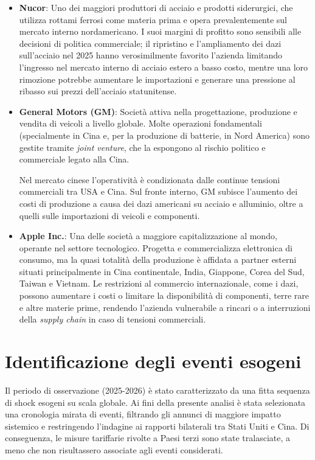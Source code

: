 \begin{itemize}
\item \textbf{Nucor}: Uno dei maggiori produttori di acciaio e prodotti siderurgici, che utilizza rottami ferrosi come materia prima e opera prevalentemente sul mercato interno nordamericano. 
I suoi margini di profitto sono sensibili alle decisioni di politica commerciale; il ripristino e l'ampliamento dei dazi sull'acciaio nel 2025 hanno verosimilmente favorito 
l'azienda limitando l'ingresso nel mercato interno di acciaio estero a basso costo, mentre una loro rimozione potrebbe aumentare le importazioni e generare una pressione al ribasso sui prezzi 
dell'acciaio statunitense\cite{sec:nucor}.

\item \textbf{General Motors (GM)}: Società attiva nella progettazione, produzione e vendita di veicoli a livello globale. Molte operazioni 
fondamentali (specialmente in Cina e, per la produzione di batterie, in Nord America) sono gestite tramite \emph{joint venture}, che la espongono al rischio politico e 
commerciale legato alla Cina.

Nel mercato cinese l'operatività è condizionata dalle continue tensioni commerciali tra USA e Cina. Sul fronte interno, 
GM subisce l'aumento dei costi di produzione a causa dei dazi americani su acciaio e alluminio, oltre a quelli sulle importazioni di veicoli 
e componenti\cite{sec:gm}.

\item \textbf{Apple Inc.}: Una delle società a maggiore capitalizzazione al mondo, operante nel settore tecnologico. Progetta e commercializza elettronica di consumo, ma la quasi totalità della 
produzione è affidata a partner esterni situati principalmente in Cina continentale, India, Giappone, Corea del Sud, Taiwan e Vietnam\cite{sec:apple}. Le restrizioni al commercio internazionale, come i dazi, possono 
aumentare i costi o limitare la disponibilità di componenti, terre rare e altre materie prime, rendendo l'azienda vulnerabile a rincari o a interruzioni della 
\emph{supply chain} in caso di tensioni commerciali.

\end{itemize}


\section{Identificazione degli eventi esogeni}
Il periodo di osservazione (2025-2026) è stato caratterizzato da una fitta sequenza di shock esogeni su scala globale. Ai fini della presente analisi è stata selezionata 
una cronologia mirata di eventi, filtrando gli annunci di maggiore impatto sistemico e restringendo l'indagine ai rapporti bilaterali tra Stati Uniti e Cina. Di conseguenza, 
le misure tariffarie rivolte a Paesi terzi sono state tralasciate, a meno che non risultassero associate agli eventi considerati.

